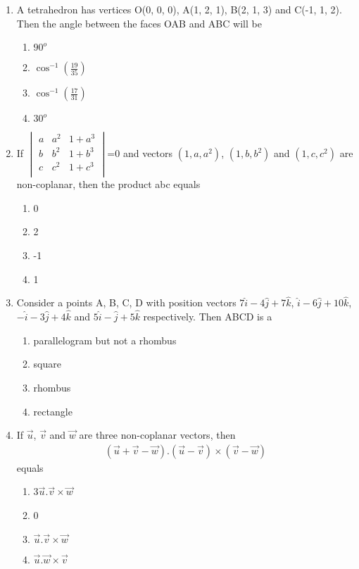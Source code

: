 \begin{enumerate}[label=\arabic*.,ref=\thesubsection.\theenumi]
\item A tetrahedron has vertices O(0, 0, 0), A(1, 2, 1), B(2, 1, 3) and C(-1, 1, 2). Then the angle between the faces OAB and ABC will be
\begin{enumerate}
\item $90^{o}$
\item $\cos^{-1}(\frac{19}{35})$
\item $\cos^{-1}(\frac{17}{31})$
\item $30^{o}$
\end{enumerate}

\item If 
$\begin{vmatrix}
a & a^{2} & 1 + a^{3} \\
b & b^{2} & 1 + b^{3} \\
c & c^{2} & 1 + c^{3} \\
\end{vmatrix}$=0
 and vectors $(1, a, a^{2})$, $(1, b, b^{2})$  and  $(1, c, c^{2})$ are non-coplanar, then the product abc equals
\begin{enumerate}
\item 0
\item 2
\item -1
\item 1
\end{enumerate}

\item Consider a points A, B, C, D with position vectors $7\hat{i} - 4\hat{j} + 7\hat{k}$, $\hat{i} - 6\hat{j} + 10\hat{k}$, $-\hat{i} - 3\hat{j} + 4\hat{k}$ and $5\hat{i} - \hat{j} + 5\hat{k}$ respectively. Then ABCD is a 
\begin{enumerate}
\item parallelogram but not a rhombus
\item square
\item rhombus
\item rectangle
\end{enumerate}

\item If $\overrightarrow{u}$, $\overrightarrow{v}$ and $\overrightarrow{w}$ are three non-coplanar vectors, then 
\begin{align*}
(\overrightarrow{u} + \overrightarrow{v} - \overrightarrow{w}).(\overrightarrow{u}-\overrightarrow{v}) \times (\overrightarrow{v}-\overrightarrow{w})
\end{align*}
equals
\begin{enumerate}
\item 3$\overrightarrow{u}.\overrightarrow{v} \times \overrightarrow{w}$
\item 0
\item $\overrightarrow{u}.\overrightarrow{v} \times \overrightarrow{w}$
\item $\overrightarrow{u}.\overrightarrow{w} \times \overrightarrow{v}$
\end{enumerate}


\end{enumerate}
